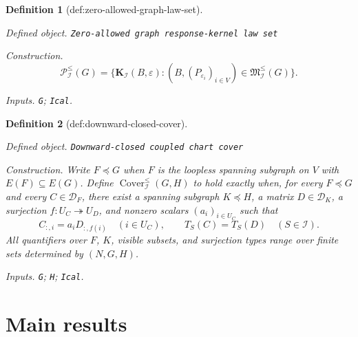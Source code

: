 \documentclass{article}
\newtheorem{definition}{Definition}
\begin{document}
\begin{definition}[def:zero-allowed-graph-law-set]\label{def:zero-allowed-graph-law-set}
\par\smallskip\noindent\emph{Defined object.} \texttt{Zero-\allowbreak{}allowed graph response-\allowbreak{}kernel law set}
\par\smallskip\noindent\emph{Construction.} \[
\mathcal P^{\le}_{\mathcal I}(G)=\{\mathbf K_{\mathcal I}(B,\varepsilon):(B,(P_{\varepsilon_i})_{i\in V})\in\mathfrak M^{\le}_{\mathcal I}(G)\}.
\]
\par\smallskip\noindent\emph{Inputs.} \texttt{G}; \texttt{Ical}.
\end{definition}

\begin{definition}[def:downward-closed-cover]\label{def:downward-closed-cover}
\par\smallskip\noindent\emph{Defined object.} \texttt{Downward-\allowbreak{}closed coupled chart cover}
\par\smallskip\noindent\emph{Construction.} Write \(F\preceq G\) when \(F\) is the loopless spanning subgraph on \(V\) with \(E(F)\subseteq E(G)\). Define \(\operatorname{Cover}^{\le}_{\mathcal I}(G,H)\) to hold exactly when, for every \(F\preceq G\) and every \(C\in\mathcal D_F\), there exist a spanning subgraph \(K\preceq H\), a matrix \(D\in\mathcal D_K\), a surjection \(f:U_C\twoheadrightarrow U_D\), and nonzero scalars \((a_i)_{i\in U_C}\) such that
\[
C_{:,i}=a_iD_{:,f(i)}\quad(i\in U_C),
\qquad
T_S(C)=T_S(D)\quad(S\in\mathcal I).
\]
All quantifiers over \(F\), \(K\), visible subsets, and surjection types range over finite sets determined by \((N,G,H)\).
\par\smallskip\noindent\emph{Inputs.} \texttt{G}; \texttt{H}; \texttt{Ical}.
\end{definition}

\section{Main results}
\end{document}
